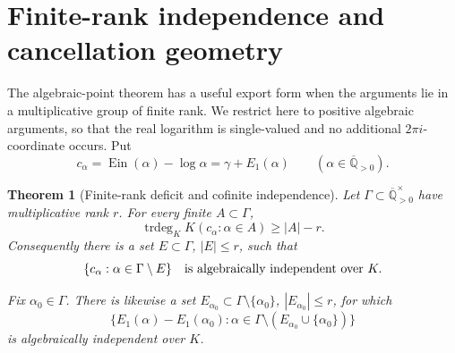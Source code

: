 \documentclass[11pt]{article}
\theoremstyle{keio}
\newtheorem{theorem}{Theorem}[section]
\theoremstyle{definition}
\theoremstyle{remark}
\newcommand{\Qbar}{\overline{\mathbb Q}}
\newcommand{\Ein}{\operatorname{Ein}}
\newcommand{\trdeg}{\operatorname{trdeg}}
\begin{document}
\section{Finite-rank independence and cancellation geometry}
\label{sec:rank-deficit}

The algebraic-point theorem has a useful export form when the arguments lie
in a multiplicative group of finite rank.  We restrict here to positive
algebraic arguments, so that the real logarithm is single-valued and no
additional \(2\pi i\)-coordinate occurs.  Put
\begin{equation}\label{eq:c-alpha}
 c_\alpha=\Ein(\alpha)-\log\alpha=\gamma+E_1(\alpha)
 \qquad(\alpha\in\Qbar_{>0}).
\end{equation}

\begin{theorem}[Finite-rank deficit and cofinite independence]
\label{thm:cofinite-independence}
Let \(\Gamma\subset\Qbar_{>0}^{\times}\) have multiplicative rank \(r\).
For every finite \(A\subset\Gamma\),
\begin{equation}\label{eq:finite-rank-deficit}
 \trdeg_KK(c_\alpha:\alpha\in A)\ge |A|-r.
\end{equation}
Consequently there is a set \(E\subset\Gamma\), \(|E|\le r\), such that
\begin{equation}\label{eq:cofinite-family}
 \{c_\alpha:\alpha\in\Gamma\setminus E\}
 \quad\hbox{is algebraically independent over }K.
\end{equation}

Fix \(\alpha_0\in\Gamma\).  There is likewise a set
\(E_{\alpha_0}\subset\Gamma\setminus\{\alpha_0\}\),
\(|E_{\alpha_0}|\le r\), for which
\begin{equation}\label{eq:cofinite-differences}
 \{E_1(\alpha)-E_1(\alpha_0):
 \alpha\in\Gamma\setminus(E_{\alpha_0}\cup\{\alpha_0\})\}
\end{equation}
is algebraically independent over \(K\).
\end{theorem}
\end{document}
